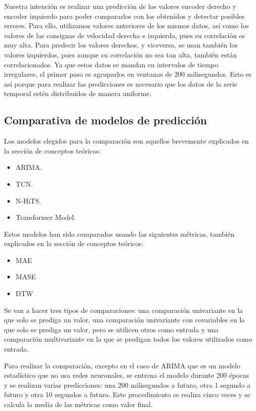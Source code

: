 Nuestra intención es realizar una predicción de los valores encoder derecho y encoder izquierdo para poder 
compararlos con los obtenidos y detectar posibles errores. Para ello, utilizamos valores anteriores de los 
mismos datos, así como los valores de las consignas de velocidad derecha e izquierda, pues su correlación 
es muy alta. Para predecir los valores derechos, y viceversa, se usan también los valores izquierdos, pues aunque su 
correlación no sea tan alta, también están correlacionados.
Ya que estos datos se mandan en intervalos de tiempo irregulares, el primer paso es agruparlos en ventanas de 200 milisegundos. 
Esto es así porque para realizar las predicciones es necesario que los datos de la serie temporal estén distribuidos 
de manera uniforme.

\subsection{Comparativa de modelos de predicción}

Los modelos elegidos para la comparación son aquellos brevemente explicados en la sección de conceptos teóricos:
\begin{itemize}
    \item ARIMA.
    \item TCN.
    \item N-HiTS.
    \item Transformer Model.
\end{itemize}

Estos modelos han sido comparados usando las siguientes métricas, también explicados en la sección de conceptos teóricos:
\begin{itemize}
    \item MAE 
    \item MASE 
    \item DTW
\end{itemize}

Se van a hacer tres tipos de comparaciones: una comparación univariante en la que solo se prediga un valor, 
una comparación univariante con covariables en la que solo se prediga un valor, pero se utilicen otros como entrada y 
una comparación multivariante en la que se predigan todos los valores utilizados como entrada.


Para realizar la comparación, excepto en el caso de ARIMA que es un modelo estadístico que no usa redes neuronales, 
se entrena el modelo durante 200 épocas y se realizan varias predicciones: una 200 milisegundos a futuro, otra 
1 segundo a futuro y otra 10 segundos a futuro. Este procedimiento se realiza cinco veces y se calcula la media 
de las métricas como valor final.

